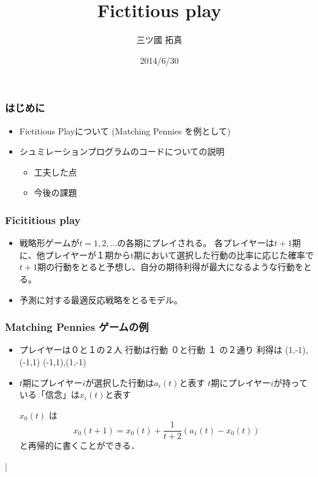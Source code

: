 \documentclass[dvipdfmx,fleqn,handout]{beamer}
\title{\Large Fictitious play}
\author{\large 三ツ國  拓真}
\date{\small 2014/6/30}
\begin{document}
\sffamily
\gtfamily


\begin{frame}
  \titlepage
  \thispagestyle{empty}
\end{frame}

\setcounter{framenumber}{0}




\begin{frame}
\frametitle{はじめに}
\begin{itemize}\setlength{\parskip}{0.5em}
\item
Fictitious Playについて
(Matching Pennies を例として)

\item
シュミレーションプログラムのコードについての説明
 \begin{itemize}\setlength{\parskip}{0.5em}
 \item
 工夫した点
 \item
 今後の課題
 \end{itemize}
\end{itemize}
\end{frame}



\begin{frame}
\frametitle{Ficititious play}
\begin{itemize}\setlength{\parskip}{0.5em}
\item
戦略形ゲームが$t=1,2,...$の各期にプレイされる。
各プレイヤーは$t+1$期に、他プレイヤーが１期からt期において選択した行動の比率に応じた確率で$t+1$期の行動をとると予想し、自分の期待利得が最大になるような行動をとる。\pause


\item
予測に対する最適反応戦略をとるモデル。\pause

\end{itemize}
\end{frame}



\begin{frame}
\frametitle{Matching Pennies ゲームの例}
\begin{itemize}\setlength{\parskip}{0.5em}
\item

プレイヤーは０と１の２人
行動は行動 ０と行動 １ の２通り
利得は (1,-1),(-1,1)
       (-1,1),(1,-1) 

\item
$t$期にプレイヤー$i$が選択した行動は$a_i(t)$と表す
$t$期にプレイヤー$i$が持っている「信念」は$x_i(t)$と表す
 \pause
 
$x_0(t)$ は
\[
x_0(t+1)
= x_0(t) + \frac{1}{t+2} (a_1(t) - x_0(t))
\]
と再帰的に書くことができる．
\end{itemize}
\end{frame}| 
\end{document}

